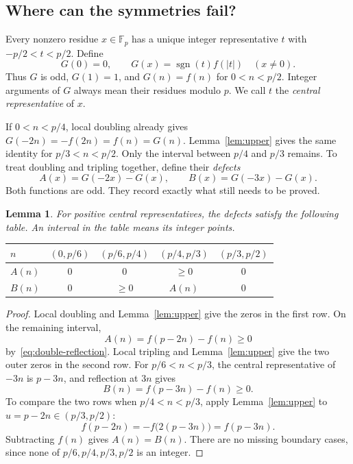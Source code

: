 \documentclass[11pt,a4paper]{article}
\newtheorem{lemma}[theorem]{Lemma}
\theoremstyle{remark}
\numberwithin{equation}{section}
\newcommand{\Fp}{\mathbb F_p}
\begin{document}
\subsection{Where can the symmetries fail?}

Every nonzero residue \(x\in\Fp\) has a unique integer representative
\(t\) with \(-p/2<t<p/2\). Define
\begin{equation}\label{eq:completion}
  G(0)=0,\qquad G(x)=\operatorname{sgn}(t)f(|t|)\quad(x\ne0).
\end{equation}
Thus \(G\) is odd, \(G(1)=1\), and \(G(n)=f(n)\) for
\(0<n<p/2\). Integer arguments of \(G\) always mean their residues
modulo \(p\). We call \(t\) the \emph{central representative} of \(x\).

If \(0<n<p/4\), local doubling already gives
\(G(-2n)=-f(2n)=f(n)=G(n)\). Lemma~\ref{lem:upper} gives the same
identity for \(p/3<n<p/2\). Only the interval between \(p/4\) and
\(p/3\) remains. To treat doubling and tripling together, define their
\emph{defects}
\begin{equation}\label{eq:defects}
  A(x)=G(-2x)-G(x),\qquad B(x)=G(-3x)-G(x).
\end{equation}
Both functions are odd. They record exactly what still needs to be proved.

\begin{lemma}\label{lem:support}
For positive central representatives, the defects satisfy the following
table. An interval in the table means its integer points.
\begin{center}
\renewcommand{\arraystretch}{1.3}
\begin{tabular}{@{}lcccc@{}}
\toprule
\(n\) & \((0,p/6)\) & \((p/6,p/4)\) & \((p/4,p/3)\) & \((p/3,p/2)\) \\
\midrule
\(A(n)\) & \(0\) & \(0\) & \(\ge0\) & \(0\) \\
\(B(n)\) & \(0\) & \(\ge0\) & \(A(n)\) & \(0\) \\
\bottomrule
\end{tabular}
\end{center}
\end{lemma}

\begin{proof}
Local doubling and Lemma~\ref{lem:upper} give the zeros in the first
row. On the remaining interval,
\[
  A(n)=f(p-2n)-f(n)\ge0
\]
by~\eqref{eq:double-reflection}. Local tripling and
Lemma~\ref{lem:upper} give the two outer zeros in the second row.
For \(p/6<n<p/3\), the central representative of \(-3n\) is
\(p-3n\), and reflection at \(3n\) gives
\[
  B(n)=f(p-3n)-f(n)\ge0.
\]
To compare the two rows when \(p/4<n<p/3\), apply
Lemma~\ref{lem:upper} to \(u=p-2n\in(p/3,p/2)\):
\[
  f(p-2n)=-f\bigl(2(p-3n)\bigr)=f(p-3n).
\]
Subtracting \(f(n)\) gives \(A(n)=B(n)\). There are no missing
boundary cases, since none of \(p/6,p/4,p/3,p/2\) is an integer.
\end{proof}
\end{document}
